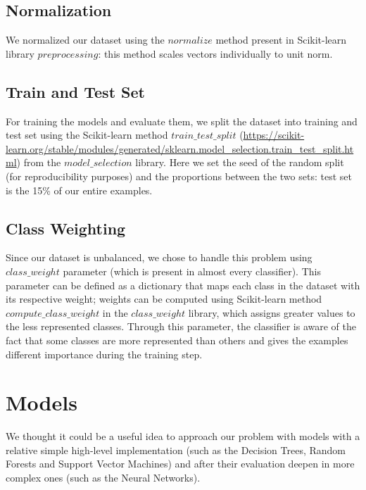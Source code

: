 \documentclass[12pt]{article}
\begin{document}
\subsection{Normalization}
We normalized our dataset using the $normalize$ method present in Scikit-learn library $preprocessing$: this method scales vectors individually to unit norm. 


\subsection{Train and Test Set}

For training the models and evaluate them, we split the dataset into training and test set using the Scikit-learn method $train\_test\_split$ (\url{https://scikit-learn.org/stable/modules/generated/sklearn.model_selection.train_test_split.html}) from the $model\_selection$ library. Here we set the seed of the random split (for reproducibility purposes) and the proportions between the two sets: test set is the 15\% of our entire examples.


\subsection{Class Weighting}
Since our dataset is unbalanced, we chose to handle this problem using $class\_weight$ parameter (which is present in almost every classifier). This parameter can be defined as a dictionary that maps each class in the dataset with its respective weight; weights can be computed using Scikit-learn method $compute\_class\_weight$ in the $class\_weight$ library, which assigns greater values to the less represented classes. Through this parameter, the classifier is aware of the fact that some classes are more represented than others and gives the examples different importance during the training step.


\section{Models}
We thought it could be a useful idea to approach our problem with models with a relative simple high-level implementation (such as the Decision Trees, Random Forests and Support Vector Machines) and after their evaluation deepen in more complex ones (such as the Neural Networks). 
\end{document}
